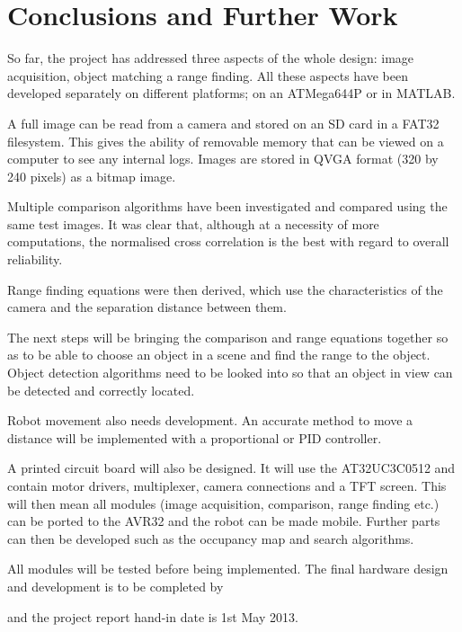 \chapter{Conclusions and Further Work} \label{Chapter: Conclusions}

So far, the project has addressed three aspects of the whole design: image acquisition, object matching a range finding. All these aspects have been developed separately on different platforms; on an ATMega644P or in MATLAB. 

A full image can be read from a camera and stored on an SD card in a FAT32 filesystem. This gives the ability of removable memory that can be viewed on a computer to see any internal logs. Images are stored in QVGA format (320 by 240 pixels) as a bitmap image. 

Multiple comparison algorithms have been investigated and compared using the same test images. It was clear that, although at a necessity of more computations, the normalised cross correlation is the best with regard to overall reliability.

Range finding equations were then derived, which use the characteristics of the camera and the separation distance between them. 

The next steps will be bringing the comparison and range equations together so as to be able to choose an object in a scene and find the range to the object. Object detection algorithms need to be looked into so that an object in view can be detected and correctly located. 

Robot movement also needs development. An accurate method to move a distance will be implemented with a proportional or PID controller. 

A printed circuit board will also be designed. It will use the AT32UC3C0512 and contain motor drivers, \itc multiplexer, camera connections and a TFT screen. This will then mean all modules (image acquisition, comparison, range finding etc.) can be ported to the AVR32 and the robot can be made mobile. Further parts can then be developed such as the occupancy map and search algorithms. 

All modules will be tested before being implemented. The final hardware design and development is to be completed by \date{15th March 2013} and the project report hand-in date is 1st May 2013. 